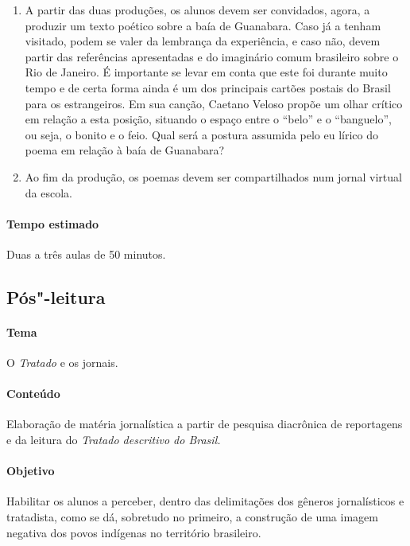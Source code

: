 \documentclass[12pt]{extarticle}
\begin{document}
\begin{enumerate}
\item 
A partir das duas produções, os alunos devem ser convidados, agora, a 
produzir um texto poético sobre a baía de Guanabara. Caso já a tenham 
visitado, podem se valer da lembrança da experiência, e caso não, devem 
partir das referências apresentadas e do imaginário comum brasileiro 
sobre o Rio de Janeiro. É importante se levar em conta que este foi 
durante muito tempo e de certa forma ainda é um dos principais cartões 
postais do Brasil para os estrangeiros. Em sua canção, Caetano Veloso 
propõe um olhar crítico em relação a esta posição, situando o espaço 
entre o ``belo'' e o ``banguelo'', ou seja, o bonito e o feio. Qual será 
a postura assumida pelo eu lírico do poema em relação à baía de Guanabara? 

\item 
Ao fim da produção, os poemas devem ser compartilhados num jornal virtual 
da escola.

\end{enumerate}
\paragraph{Tempo estimado} Duas a três aulas de 50 minutos.

\subsection{Pós"-leitura}

\paragraph{Tema} O \emph{Tratado} e os jornais.  

\paragraph{Conteúdo} Elaboração de matéria jornalística a partir
de pesquisa diacrônica de reportagens e da leitura do \emph{Tratado descritivo do Brasil.}

\paragraph{Objetivo} Habilitar os alunos a perceber, dentro das 
delimitações dos gêneros jornalísticos e tratadista, como se dá,
sobretudo no primeiro, a construção de uma imagem negativa dos povos 
indígenas no território brasileiro.
\end{document}
